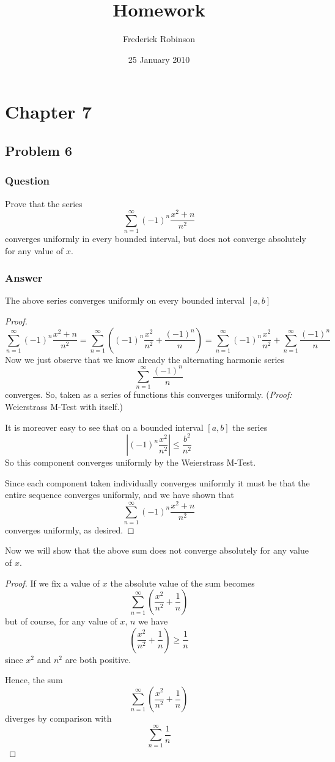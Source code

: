\documentclass[12pt]{article}
\title{Homework}
\author{Frederick Robinson}
\date{25 January 2010}
\begin{document}

   \maketitle

\setcounter{tocdepth}{2} 


\section{Chapter 7}
\subsection{Problem 6}

\subsubsection{Question}
Prove that the series 
\[\sum_{n=1}^\infty (-1)^n \frac{x^2+n}{n^2} \]
converges uniformly in every bounded interval, but does not converge absolutely for any value of $x$.
\subsubsection{Answer}
The above series converges uniformly on every bounded interval $[a,b]$

\begin{proof}
\[\sum_{n=1}^\infty (-1)^n \frac{x^2+n}{n^2} = \sum_{n=1}^\infty \left( (-1)^n \frac{x^2}{n^2} +  \frac{(-1)^n }{n} \right)  = \sum_{n=1}^\infty (-1)^n \frac{x^2}{n^2} +\sum_{n=1}^\infty  \frac{(-1)^n }{n} \]
Now we just observe that we know already the alternating harmonic series 
\[\sum_{n=1}^\infty  \frac{(-1)^n }{n} \]
converges. So, taken as a series of functions this converges uniformly. (\emph{Proof:} Weierstrass M-Test with itself.)

It is moreover easy to see that on a bounded interval $[a,b]$ the series 
\[ \left| (-1)^n \frac{x^2}{n^2} \right| \leq  \frac{b^2}{n^2}\]
So this component converges uniformly by the Weierstrass M-Test.

Since each component taken individually converges uniformly it must be that the entire sequence converges uniformly, and we have shown that 
\[\sum_{n=1}^\infty (-1)^n \frac{x^2+n}{n^2} \]
converges uniformly, as desired.
\end{proof}

Now we will show that the above sum does not converge absolutely for any value of $x$.
\begin{proof}

If we fix a value of $x$ the absolute value of the sum becomes 
\[\sum_{n=1}^\infty \left( \frac{x^2}{n^2}+ \frac{1}{n} \right) \]
but of course, for any value of $x$, $n$ we have 
\[ \left( \frac{x^2}{n^2}+ \frac{1}{n} \right) \geq \frac{1}{n}\]
since $x^2$ and $n^2$ are both positive.

Hence, the sum
\[\sum_{n=1}^\infty \left( \frac{x^2}{n^2}+ \frac{1}{n} \right) \]
diverges by comparison with 
\[\sum_{n=1}^\infty \frac{1}{n} \]


\end{proof}
\end{document}
